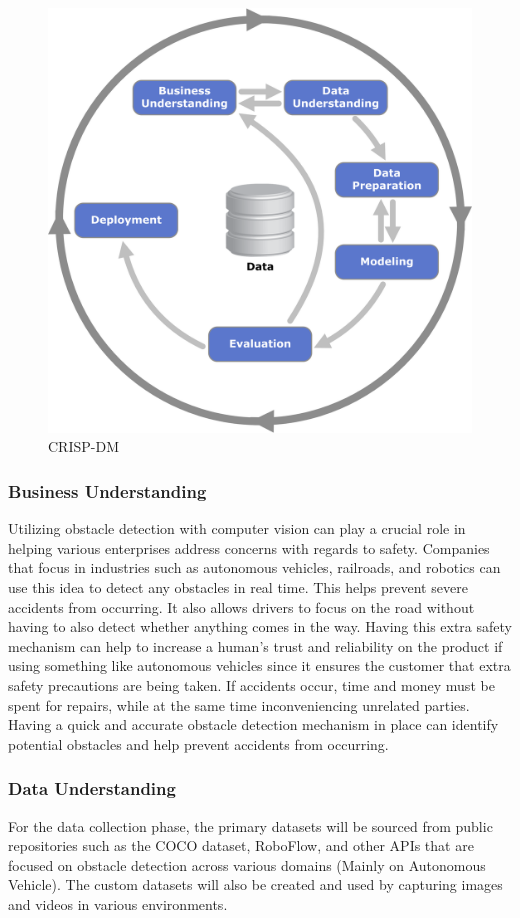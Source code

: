 \documentclass[stu,12pt,floatsintext]{apa7}
\begin{document}
\begin{figure}[!htb]
	\centering
	\includegraphics[width=0.5\linewidth]{./images/CRISP-DM.png}
	\caption{CRISP-DM}
	\label{fig:crispdm}
\end{figure}

\subsubsection{Business Understanding}
Utilizing obstacle detection with computer vision can play a crucial role in helping various enterprises address concerns with regards to safety. Companies that focus in industries such as autonomous vehicles, railroads, and robotics can use this idea to detect any obstacles in real time. This helps prevent severe accidents from occurring. It also allows drivers to focus on the road without having to also detect whether anything comes in the way. Having this extra safety mechanism can help to increase a human's trust and reliability on the product if using something like autonomous vehicles since it ensures the customer that extra safety precautions are being taken. If accidents occur, time and money must be spent for repairs, while at the same time inconveniencing unrelated parties. Having a quick and accurate obstacle detection mechanism in place can identify potential obstacles and help prevent accidents from occurring.


\subsubsection{Data Understanding}
For the data collection phase, the primary datasets will be sourced from public repositories such as the COCO dataset, RoboFlow, and other APIs that are focused on obstacle detection across various domains (Mainly on Autonomous Vehicle). The custom datasets will also be created and used by capturing images and videos in various environments.
\end{document}
